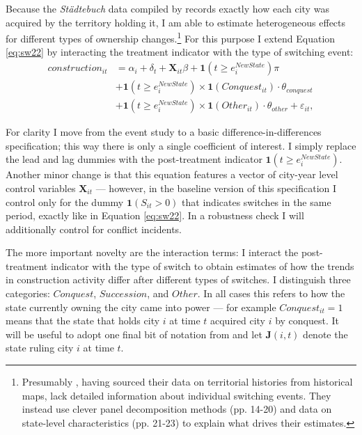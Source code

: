 \documentclass[11pt, a4paper]{article}
\begin{document}
Because the \textit{Städtebuch} data compiled by \cite{pt2} records exactly how each city was acquired by the territory holding it, I am able to estimate heterogeneous effects for different types of ownership changes.\footnote
{
Presumably \cite{schoenholzer2022}, having sourced their data on territorial histories from historical maps, lack detailed information about individual switching events. They instead use clever panel decomposition methods (pp. 14-20) and data on state-level characteristics (pp. 21-23) to explain what drives their estimates.
}
For this purpose I extend Equation \eqref{eq:sw22} by interacting the treatment indicator with the type of switching event:
\begin{equation}
\label{eq:baseline}
\begin{split}
    construction_{it} &= \alpha_i + \delta_t + \mathbf{X}_{it} \beta + 
    \mathbf{1}(t \ge e^{NewState}_i) \pi \\
    &+ \mathbf{1}(t \ge e^{NewState}_i) \times
    \mathbf{1}(Conquest_{it}) \cdot \theta_{conquest} \\
    &+ \mathbf{1}(t \ge e^{NewState}_i) \times
    \mathbf{1}(Other_{it}) \cdot \theta_{other} + \varepsilon_{it},
\end{split}
\end{equation}

For clarity I move from the event study to a basic difference-in-differences specification; this way there is only a single coefficient of interest. I simply replace the lead and lag dummies with the post-treatment indicator $\mathbf{1}(t \ge e^{NewState}_i)$. Another minor change is that this equation features a vector of city-year level control variables $\mathbf{X}_{it}$ --- however, in the baseline version of this specification I control only for the dummy $\mathbf{1}(S_{it} > 0)$ that indicates switches in the same period, exactly like in Equation \eqref{eq:sw22}. In a robustness check I will additionally control for conflict incidents.

The more important novelty are the interaction terms: I interact the post-treatment indicator with the type of switch to obtain estimates of how the trends in construction activity differ after different types of switches. I distinguish three categories: $Conquest$, $Succession$, and $Other$. In all cases this refers to how the state currently owning the city came into power --- for example $Conquest_{it} = 1$ means that the state that holds city $i$ at time $t$ acquired city $i$ by conquest. It will be useful to adopt one final bit of notation from \cite{schoenholzer2022} and let $\mathbf{J}(i, t)$ denote the state ruling city $i$ at time $t$.
\end{document}
